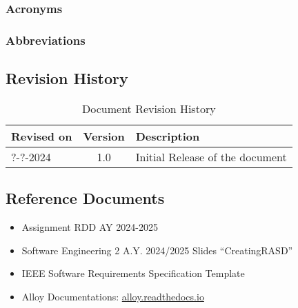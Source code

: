 \subsubsection{Acronyms}

\subsubsection{Abbreviations}


\subsection{Revision History}
\begin{table}[h]
    \centering
    \begin{tabular}{|l|c|l|}
        \hline
        Revised on & Version & Description\\ \hline
        ?-?-2024 & 1.0     & Initial Release of the document \\ \hline
    \end{tabular}
    \caption{Document Revision History}
    \label{tab:revision_history_table}
\end{table}

\subsection{Reference Documents}
\begin{itemize}
  \item Assignment RDD AY 2024-2025
  \item Software Engineering 2 A.Y. 2024/2025 Slides “CreatingRASD”
  \item IEEE Software Requirements Specification Template
  \item Alloy Documentations: \url{alloy.readthedocs.io}
\end{itemize}


